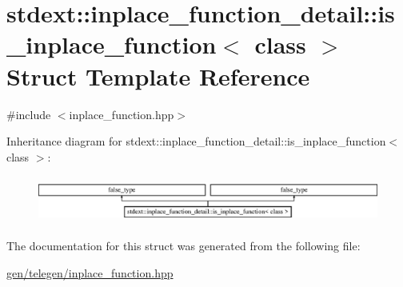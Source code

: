 \hypertarget{structstdext_1_1inplace__function__detail_1_1is__inplace__function}{}\section{stdext\+:\+:inplace\+\_\+function\+\_\+detail\+:\+:is\+\_\+inplace\+\_\+function$<$ class $>$ Struct Template Reference}
\label{structstdext_1_1inplace__function__detail_1_1is__inplace__function}


{\ttfamily \#include $<$inplace\+\_\+function.\+hpp$>$}

Inheritance diagram for stdext\+:\+:inplace\+\_\+function\+\_\+detail\+:\+:is\+\_\+inplace\+\_\+function$<$ class $>$\+:\begin{figure}[H]
\begin{center}
\leavevmode
\includegraphics[height=1.573034cm]{structstdext_1_1inplace__function__detail_1_1is__inplace__function}
\end{center}
\end{figure}


The documentation for this struct was generated from the following file\+:\begin{DoxyCompactItemize}
\item 
\hyperlink{gen_2telegen_2inplace__function_8hpp}{gen/telegen/inplace\+\_\+function.\+hpp}\end{DoxyCompactItemize}
